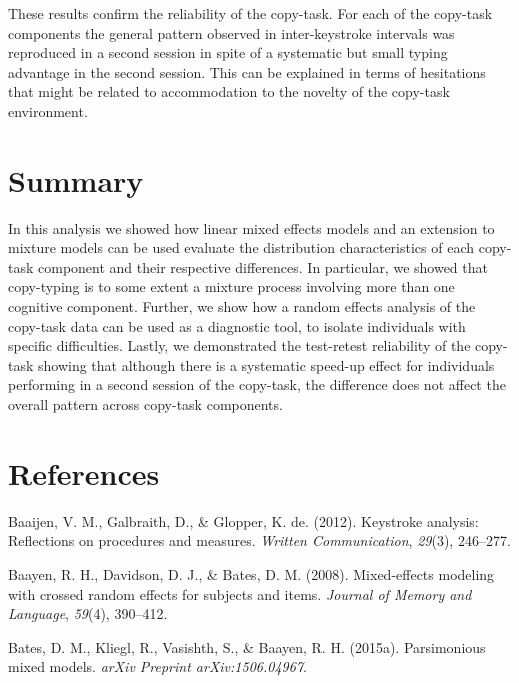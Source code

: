 \documentclass[,man,floatsintext]{apa6}
\begin{document}
These results confirm the reliability of the copy-task. For each of the copy-task components the general pattern observed in inter-keystroke intervals was reproduced in a second session in spite of a systematic but small typing advantage in the second session. This can be explained in terms of hesitations that might be related to accommodation to the novelty of the copy-task environment.

\hypertarget{summary}{%
\section{Summary}\label{summary}}

In this analysis we showed how linear mixed effects models and an extension to mixture models can be used evaluate the distribution characteristics of each copy-task component and their respective differences. In particular, we showed that copy-typing is to some extent a mixture process involving more than one cognitive component. Further, we show how a random effects analysis of the copy-task data can be used as a diagnostic tool, to isolate individuals with specific difficulties. Lastly, we demonstrated the test-retest reliability of the copy-task showing that although there is a systematic speed-up effect for individuals performing in a second session of the copy-task, the difference does not affect the overall pattern across copy-task components.

\hypertarget{references}{%
\section{References}\label{references}}

\begingroup
\setlength{\parindent}{-0.5in}
\setlength{\leftskip}{0.5in}

\hypertarget{ref}{}

\endgroup

\hypertarget{refs}{}
\leavevmode\hypertarget{ref-baaijen2012keystroke}{}%
Baaijen, V. M., Galbraith, D., \& Glopper, K. de. (2012). Keystroke analysis: Reflections on procedures and measures. \emph{Written Communication}, \emph{29}(3), 246--277.

\leavevmode\hypertarget{ref-baa08}{}%
Baayen, R. H., Davidson, D. J., \& Bates, D. M. (2008). Mixed-effects modeling with crossed random effects for subjects and items. \emph{Journal of Memory and Language}, \emph{59}(4), 390--412.

\leavevmode\hypertarget{ref-bates2015parsimonious}{}%
Bates, D. M., Kliegl, R., Vasishth, S., \& Baayen, R. H. (2015a). Parsimonious mixed models. \emph{arXiv Preprint arXiv:1506.04967}.
\end{document}
